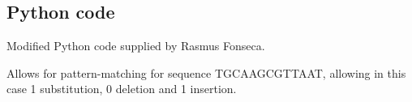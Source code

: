 \begin{appendices}
\section{Python code}
\label{app:py}
Modified Python code supplied by Rasmus Fonseca.

Allows for pattern-matching for sequence TGCAAGCGTTAAT, allowing in this case 1 substitution, 0 deletion and 1 insertion.
\end{appendices}
